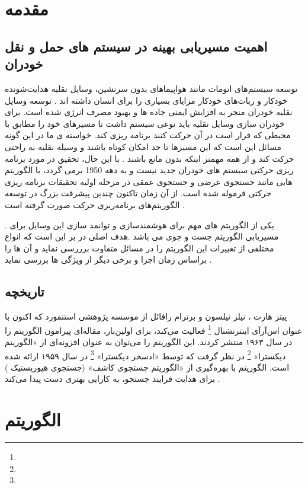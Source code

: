 \chapter{مقدمه}

\section{اهمیت مسیریابی بهینه در سیستم های حمل و نقل خودران}
توسعه سیستم‌های اتومات مانند هواپیماهای بدون سرنشین، وسایل نقلیه هدایت‌شونده خودکار و ربات‌های خودکار مزایای بسیاری را برای انسان داشته اند . توسعه وسایل نقلیه خودران منجر به افزایش ایمنی جاده ها و بهبود مصرف انرژی شده است. برای خودران سازی وسایل نقلیه باید نوعی سیستم داشت تا مسیرهای خود را مطابق با محیطی که قرار است در آن حرکت کنند برنامه ریزی کند. خواسته ی ما در این گونه مسائل این است که  این مسیرها تا حد امکان کوتاه باشند و وسیله نقلیه به راحتی حرکت کند و از همه مهمتر اینکه بدون مانع باشند .
با این حال، تحقیق در مورد برنامه ریزی حرکتی سیستم های خودران جدید نیست و به دهه 1950 برمی گردد، با الگوریتم هایی مانند جستجوی عرضی و جستجوی عمقی در مرحله اولیه تحقیقات برنامه ریزی حرکتی فرموله شده است. از آن زمان تاکنون چندین پیشرفت بزرگ در توسعه الگوریتم‌های برنامه‌ریزی حرکت صورت گرفته است . 
\cite{paliwal2023survey}

. یکی از الگوریتم های مهم برای هوشمندسازی و توانمد سازی این وسایل برای مسیریابی الگوریتم جست و جوی 
می باشد .هدف اصلی در
\cite{paliwal2023survey}
بر این است که انواع مختلفی از تغییرات این الگوریتم را در مسائل متفاوت برررسی نماید و آن ها را براساس زمان اجرا و برخی دیگر از ویژگی ها بررسی نماید .
\section{تاریخچه}
پیتر هارت 
، نیلز نیلسون 
و برترام رافائل 
از موسسه پژوهشی استنفورد 
که اکنون با عنوان اس‌آرآی اینترنشنال 
\footnote{} 
فعالیت می‌کند، برای اولین‌بار، مقاله‌ای پیرامون الگوریتم
را در سال ۱۹۶۳ منتشر کردند. این الگوریتم را می‌توان به عنوان افزونه‌ای از «الگوریتم دیکسترا» 
\footnote{}
در نظر گرفت که توسط «ادسخر دیکسترا»
\footnote{}
در سال ۱۹۵۹ ارائه شده است. الگوریتم 
با بهره‌گیری از «الگوریتم جستجوی کاشف» (جستجوی هیوریستیک  
) 
برای هدایت فرایند جستجو، به کارایی بهتری دست پیدا می‌کند
\cite{ELhamalgoritma_star}
.
\chapter{الگوریتم }
